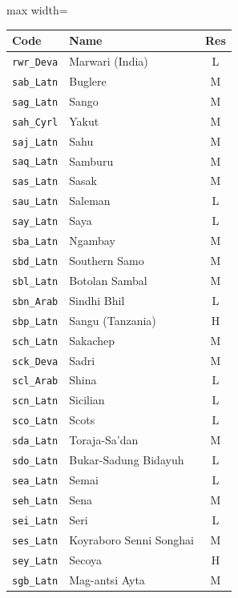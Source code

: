 {
    \tiny\renewcommand{\arraystretch}{.8}
    \begin{adjustbox}{max width=\textwidth}
    \begin{tabular}{llc}
        \toprule
        \textbf{Code} & \textbf{Name} & \textbf{Res}\\
        \midrule
        \texttt{rwr\_Deva} & Marwari (India) & L \\
        \texttt{sab\_Latn} & Buglere & M \\
        \texttt{sag\_Latn} & Sango & M \\
        \texttt{sah\_Cyrl} & Yakut & M \\
        \texttt{saj\_Latn} & Sahu & M \\
        \texttt{saq\_Latn} & Samburu & M \\
        \texttt{sas\_Latn} & Sasak & M \\
        \texttt{sau\_Latn} & Saleman & L \\
        \texttt{say\_Latn} & Saya & L \\
        \texttt{sba\_Latn} & Ngambay & M \\
        \texttt{sbd\_Latn} & Southern Samo & M \\
        \texttt{sbl\_Latn} & Botolan Sambal & M \\
        \texttt{sbn\_Arab} & Sindhi Bhil & L \\
        \texttt{sbp\_Latn} & Sangu (Tanzania) & H \\
        \texttt{sch\_Latn} & Sakachep & M \\
        \texttt{sck\_Deva} & Sadri & M \\
        \texttt{scl\_Arab} & Shina & L \\
        \texttt{scn\_Latn} & Sicilian & L \\
        \texttt{sco\_Latn} & Scots & L \\
        \texttt{sda\_Latn} & Toraja-Sa'dan & M \\
        \texttt{sdo\_Latn} & Bukar-Sadung Bidayuh & L \\
        \texttt{sea\_Latn} & Semai & L \\
        \texttt{seh\_Latn} & Sena & M \\
        \texttt{sei\_Latn} & Seri & L \\
        \texttt{ses\_Latn} & Koyraboro Senni Songhai & M \\
        \texttt{sey\_Latn} & Secoya & H \\
        \texttt{sgb\_Latn} & Mag-antsi Ayta & M \\

\end{tabular}
\end{adjustbox}}

